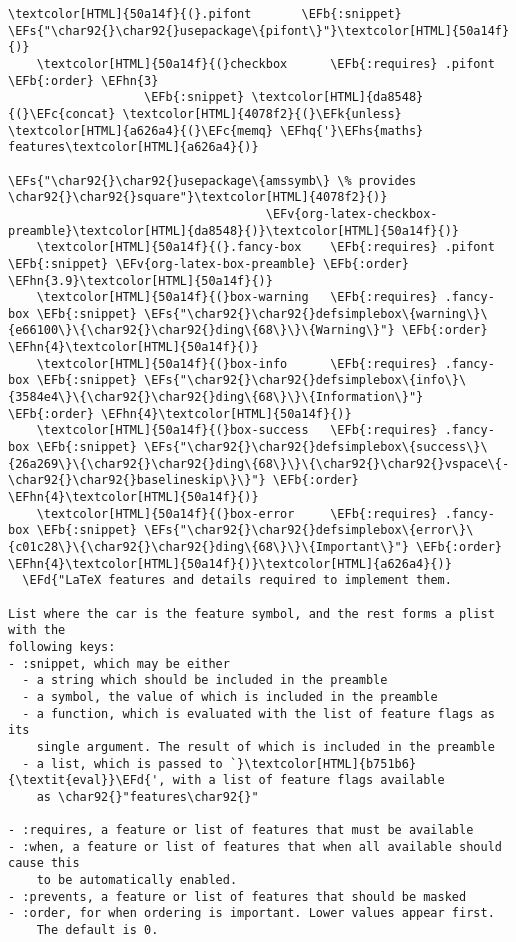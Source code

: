 \documentclass{scrartcl}
\newcommand{\EFk}[1]{\textcolor{EFk}{#1}} %
\newcommand{\EFd}[1]{\textcolor{EFd}{\textit{#1}}} %
\newcommand{\EFs}[1]{\textcolor{EFs}{#1}} %
\newcommand{\EFb}[1]{\textcolor{EFb}{#1}} %
\newcommand{\EFc}[1]{\textcolor{EFc}{#1}} %
\newcommand{\EFv}[1]{\textcolor{EFv}{#1}} %
\newcommand{\EFhn}[1]{\textcolor{EFhn}{\textbf{#1}}} %
\newcommand{\EFhq}[1]{\textcolor{EFhq}{#1}} %
\newcommand{\EFhs}[1]{\textcolor{EFhs}{#1}} %
\begin{document}
\begin{enumerate}
\begin{Code}
\begin{Verbatim}[]
    \textcolor[HTML]{50a14f}{(}.pifont       \EFb{:snippet} \EFs{"\char92{}\char92{}usepackage\{pifont\}"}\textcolor[HTML]{50a14f}{)}
    \textcolor[HTML]{50a14f}{(}checkbox      \EFb{:requires} .pifont \EFb{:order} \EFhn{3}
                   \EFb{:snippet} \textcolor[HTML]{da8548}{(}\EFc{concat} \textcolor[HTML]{4078f2}{(}\EFk{unless} \textcolor[HTML]{a626a4}{(}\EFc{memq} \EFhq{'}\EFhs{maths} features\textcolor[HTML]{a626a4}{)}
                                      \EFs{"\char92{}\char92{}usepackage\{amssymb\} \% provides \char92{}\char92{}square"}\textcolor[HTML]{4078f2}{)}
                                    \EFv{org-latex-checkbox-preamble}\textcolor[HTML]{da8548}{)}\textcolor[HTML]{50a14f}{)}
    \textcolor[HTML]{50a14f}{(}.fancy-box    \EFb{:requires} .pifont    \EFb{:snippet} \EFv{org-latex-box-preamble} \EFb{:order} \EFhn{3.9}\textcolor[HTML]{50a14f}{)}
    \textcolor[HTML]{50a14f}{(}box-warning   \EFb{:requires} .fancy-box \EFb{:snippet} \EFs{"\char92{}\char92{}defsimplebox\{warning\}\{e66100\}\{\char92{}\char92{}ding\{68\}\}\{Warning\}"} \EFb{:order} \EFhn{4}\textcolor[HTML]{50a14f}{)}
    \textcolor[HTML]{50a14f}{(}box-info      \EFb{:requires} .fancy-box \EFb{:snippet} \EFs{"\char92{}\char92{}defsimplebox\{info\}\{3584e4\}\{\char92{}\char92{}ding\{68\}\}\{Information\}"} \EFb{:order} \EFhn{4}\textcolor[HTML]{50a14f}{)}
    \textcolor[HTML]{50a14f}{(}box-success   \EFb{:requires} .fancy-box \EFb{:snippet} \EFs{"\char92{}\char92{}defsimplebox\{success\}\{26a269\}\{\char92{}\char92{}ding\{68\}\}\{\char92{}\char92{}vspace\{-\char92{}\char92{}baselineskip\}\}"} \EFb{:order} \EFhn{4}\textcolor[HTML]{50a14f}{)}
    \textcolor[HTML]{50a14f}{(}box-error     \EFb{:requires} .fancy-box \EFb{:snippet} \EFs{"\char92{}\char92{}defsimplebox\{error\}\{c01c28\}\{\char92{}\char92{}ding\{68\}\}\{Important\}"} \EFb{:order} \EFhn{4}\textcolor[HTML]{50a14f}{)}\textcolor[HTML]{a626a4}{)}
  \EFd{"LaTeX features and details required to implement them.

List where the car is the feature symbol, and the rest forms a plist with the
following keys:
- :snippet, which may be either
  - a string which should be included in the preamble
  - a symbol, the value of which is included in the preamble
  - a function, which is evaluated with the list of feature flags as its
    single argument. The result of which is included in the preamble
  - a list, which is passed to `}\textcolor[HTML]{b751b6}{\textit{eval}}\EFd{', with a list of feature flags available
    as \char92{}"features\char92{}"

- :requires, a feature or list of features that must be available
- :when, a feature or list of features that when all available should cause this
    to be automatically enabled.
- :prevents, a feature or list of features that should be masked
- :order, for when ordering is important. Lower values appear first.
    The default is 0.


\end{Verbatim}
\end{Code}
\end{enumerate}
\end{document}
